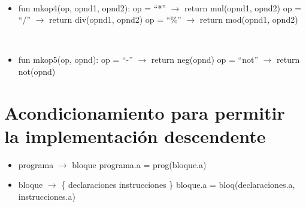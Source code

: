 \documentclass[11pt]{article}
\begin{document}
        \
        \begin{itemize}
            \item fun mkop4(op, opnd1, opnd2):
                \subitem op = “*”    $\rightarrow$ return mul(opnd1, opnd2)
                \subitem op = “/”    $\rightarrow$ return div(opnd1, opnd2)
                \subitem op = “\%”  $\rightarrow$ return mod(opnd1, opnd2)
        \end{itemize}
        \ 
        \
        \begin{itemize}
            \item fun mkop5(op, opnd):
                \subitem op = “-”    $\rightarrow$ return neg(opnd)
                \subitem op = “not”    $\rightarrow$ return not(opnd)
        \end{itemize}

    \section{Acondicionamiento para permitir la implementación descendente}
        \begin{itemize}
            \item programa $\rightarrow$ bloque
                \subitem programa.a = prog(bloque.a)
            \item bloque $\rightarrow$ \{ declaraciones instrucciones \}
                \subitem bloque.a = bloq(declaraciones.a, instrucciones.a)
        \end{itemize}
        \
\end{document}
